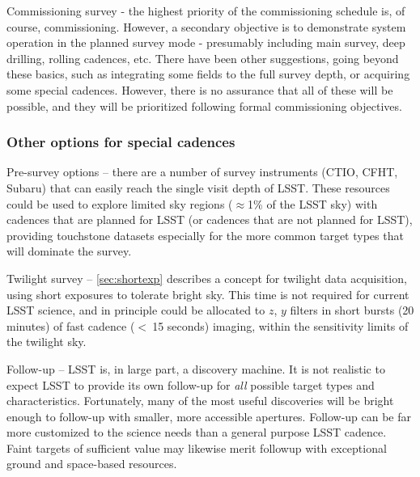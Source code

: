 \begin{description}
\item{Commissioning survey} - the highest priority of the commissioning
schedule is, of course, commissioning.  However, a secondary objective
is to demonstrate system operation in the planned survey mode -
presumably including main survey, deep drilling, rolling cadences, etc.
There have been other suggestions, going beyond these basics, such as
integrating some fields to the full survey depth, or acquiring some
special cadences.  However, there is no assurance that all of these will
be possible, and they will be prioritized following formal commissioning
objectives.

\end{description}

\subsubsection{Other options for special cadences}

\begin{description}

\item{Pre-survey options} -- there are a number of survey instruments
(CTIO, CFHT, Subaru) that can easily reach the single visit depth of
LSST. These resources could be used to explore limited sky regions
($\approx$1\% of the LSST sky) with cadences that are planned for LSST
(or cadences that are not planned for LSST), providing touchstone
datasets especially for the more common target types that will dominate
the survey.

\item{Twilight survey} -- \autoref{sec:shortexp} describes a concept for
twilight data acquisition, using short exposures to tolerate bright sky.
This time is not required for current LSST science, and in principle
could be allocated to $z$, $y$ filters in short bursts (20 minutes) of
fast cadence ($<~$15 seconds) imaging, within the sensitivity limits of
the twilight sky.

\item{Follow-up} -- LSST is, in large part, a discovery machine. It is
not realistic to expect LSST to provide its own follow-up for {\it all}
possible target types and characteristics. Fortunately, many of the most
useful discoveries will be bright enough to follow-up with smaller, more
accessible apertures.  Follow-up can be far more customized to the
science needs than a general purpose LSST cadence.  Faint targets of
sufficient value may likewise merit followup with exceptional  ground
and space-based resources.

\end{description}


